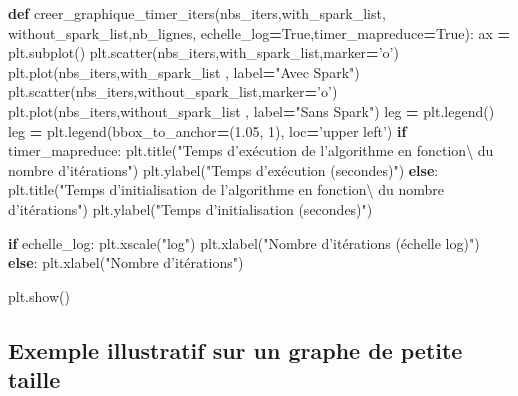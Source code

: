 \documentclass[10pt,a4paper]{article}
\newenvironment{Shaded}{\begin{snugshade}}{\end{snugshade}}
\newcommand{\ControlFlowTok}[1]{\textcolor[rgb]{0.13,0.29,0.53}{\textbf{#1}}}
\newcommand{\DecValTok}[1]{\textcolor[rgb]{0.00,0.00,0.81}{#1}}
\newcommand{\FloatTok}[1]{\textcolor[rgb]{0.00,0.00,0.81}{#1}}
\newcommand{\KeywordTok}[1]{\textcolor[rgb]{0.13,0.29,0.53}{\textbf{#1}}}
\newcommand{\NormalTok}[1]{#1}
\newcommand{\OperatorTok}[1]{\textcolor[rgb]{0.81,0.36,0.00}{\textbf{#1}}}
\newcommand{\StringTok}[1]{\textcolor[rgb]{0.31,0.60,0.02}{#1}}
\newcommand{\VariableTok}[1]{\textcolor[rgb]{0.00,0.00,0.00}{#1}}
\theoremstyle{break}
\begin{document}
\begin{Shaded}
\begin{Highlighting}[]
\KeywordTok{def}\NormalTok{ creer_graphique_timer_iters(nbs_iters,with_spark_list,}
\NormalTok{                                without_spark_list,nb_lignes,}
\NormalTok{                                echelle_log}\OperatorTok{=}\VariableTok{True}\NormalTok{,timer_mapreduce}\OperatorTok{=}\VariableTok{True}\NormalTok{):    }
\NormalTok{    ax }\OperatorTok{=}\NormalTok{ plt.subplot()}
\NormalTok{    plt.scatter(nbs_iters,with_spark_list,marker}\OperatorTok{=}\StringTok{'o'}\NormalTok{)}
\NormalTok{    plt.plot(nbs_iters,with_spark_list , label}\OperatorTok{=}\StringTok{"Avec Spark"}\NormalTok{)}
\NormalTok{    plt.scatter(nbs_iters,without_spark_list,marker}\OperatorTok{=}\StringTok{'o'}\NormalTok{)}
\NormalTok{    plt.plot(nbs_iters,without_spark_list , label}\OperatorTok{=}\StringTok{"Sans Spark"}\NormalTok{)}
\NormalTok{    leg }\OperatorTok{=}\NormalTok{ plt.legend()}
\NormalTok{    leg }\OperatorTok{=}\NormalTok{ plt.legend(bbox_to_anchor}\OperatorTok{=}\NormalTok{(}\FloatTok{1.05}\NormalTok{, }\DecValTok{1}\NormalTok{), loc}\OperatorTok{=}\StringTok{'upper left'}\NormalTok{)}
    \ControlFlowTok{if}\NormalTok{ timer_mapreduce:}
\NormalTok{        plt.title(}\StringTok{"Temps d'exécution de l'algorithme en fonction\textbackslash{}}
\StringTok{                  du nombre d'itérations"}\NormalTok{)}
\NormalTok{        plt.ylabel(}\StringTok{"Temps d'exécution (secondes)"}\NormalTok{)}
    \ControlFlowTok{else}\NormalTok{:}
\NormalTok{        plt.title(}\StringTok{"Temps d'initialisation de l'algorithme en fonction\textbackslash{}}
\StringTok{        du nombre d'itérations"}\NormalTok{)}
\NormalTok{        plt.ylabel(}\StringTok{"Temps d'initialisation (secondes)"}\NormalTok{)}
        
    \ControlFlowTok{if}\NormalTok{ echelle_log:}
\NormalTok{        plt.xscale(}\StringTok{"log"}\NormalTok{)}
\NormalTok{        plt.xlabel(}\StringTok{"Nombre d'itérations (échelle log)"}\NormalTok{)}
    \ControlFlowTok{else}\NormalTok{:}
\NormalTok{        plt.xlabel(}\StringTok{"Nombre d'itérations"}\NormalTok{)}
    
\NormalTok{    plt.show()}
\end{Highlighting}
\end{Shaded}

\hypertarget{exemple-illustratif-sur-un-graphe-de-petite-taille}{%
\subsection{Exemple illustratif sur un graphe de petite taille}\label{exemple-illustratif-sur-un-graphe-de-petite-taille}}
\end{document}
